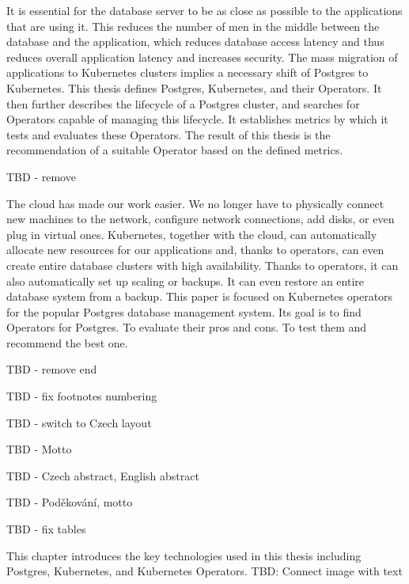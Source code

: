 
It is essential for the database server to be as close as possible to the applications that are using it. This reduces the number of men in the middle between the database and the application, which reduces database access latency and thus reduces overall application latency and increases security. The mass migration of applications to Kubernetes clusters implies a necessary shift of Postgres to Kubernetes. This thesis defines Postgres, Kubernetes, and their Operators. It then further describes the lifecycle of a Postgres cluster, and searches for Operators capable of managing this lifecycle. It establishes metrics by which it tests and evaluates these Operators.  The result of this thesis is the recommendation of a suitable Operator based on the defined metrics.

TBD - remove

The cloud has made our work easier. We no longer have to physically connect new machines to the network, configure network connections, add disks, or even plug in virtual ones. Kubernetes, together with the cloud, can automatically allocate new resources for our applications and, thanks to operators, can even create entire database clusters with high availability. Thanks to operators, it can also automatically set up scaling or backups. It can even restore an entire database system from a backup. This paper is focused on Kubernetes operators for the popular Postgres database management system. Its goal is to find Operators for Postgres. To evaluate their pros and cons. To test them and recommend the best one.

TBD - remove end

TBD - fix footnotes numbering

TBD - switch to Czech layout

TBD - Motto

TBD - Czech abstract, English abstract

TBD - Poděkování, motto

TBD - fix tables



This chapter introduces the key technologies used in this thesis including Postgres, Kubernetes, and Kubernetes Operators.
TBD: Connect image with text

